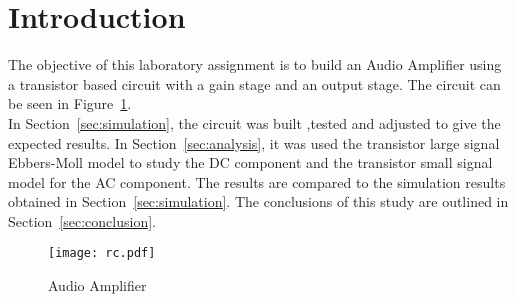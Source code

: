 \section{Introduction}
\label{sec:introduction}

\par The objective of this laboratory assignment is to build an Audio Amplifier using a transistor based circuit with a gain stage and an output stage. The circuit can be seen in Figure~\ref{fig:rc}.\\


In Section~\ref{sec:simulation}, the circuit was built ,tested and adjusted to give the expected results.
In Section~\ref{sec:analysis}, it was used the transistor large signal
Ebbers-Moll model  to study the DC component and the transistor small signal
model for the AC component. The results are compared to the simulation results obtained in Section~\ref{sec:simulation}. The conclusions of this study are outlined in
Section~\ref{sec:conclusion}.

\begin{figure}[h] \centering
\texttt{[image: rc.pdf]}
\caption{Audio Amplifier}
\label{fig:rc}
\end{figure}
